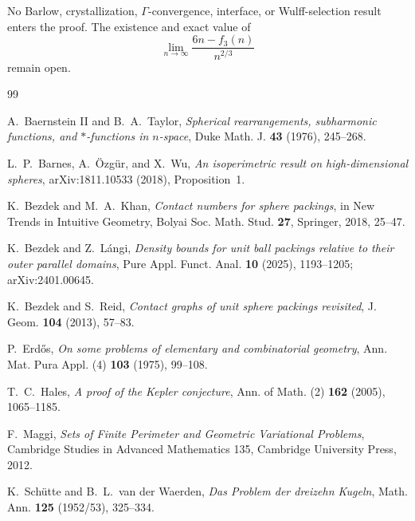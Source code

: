 No Barlow, crystallization, $\Gamma$-convergence, interface, or Wulff-selection
result enters the proof.  The existence and exact value of
\[
 \lim_{n\to\infty}\frac{6n-f_3(n)}{n^{2/3}}
\]
remain open.

\begin{thebibliography}{99}

A.~Baernstein II and B.~A.~Taylor,
\emph{Spherical rearrangements, subharmonic functions, and $*$-functions in
$n$-space}, Duke Math. J. \textbf{43} (1976), 245--268.

L.~P.~Barnes, A.~\"Ozg\"ur, and X.~Wu,
\emph{An isoperimetric result on high-dimensional spheres},
arXiv:1811.10533 (2018), Proposition~1.

K.~Bezdek and M.~A.~Khan,
\emph{Contact numbers for sphere packings},
in New Trends in Intuitive Geometry,
Bolyai Soc. Math. Stud. \textbf{27}, Springer, 2018, 25--47.

K.~Bezdek and Z.~L\'angi,
\emph{Density bounds for unit ball packings relative to their outer parallel
domains}, Pure Appl. Funct. Anal. \textbf{10} (2025), 1193--1205;
arXiv:2401.00645.

K.~Bezdek and S.~Reid,
\emph{Contact graphs of unit sphere packings revisited},
J. Geom. \textbf{104} (2013), 57--83.

P.~Erd\H{o}s,
\emph{On some problems of elementary and combinatorial geometry},
Ann. Mat. Pura Appl. (4) \textbf{103} (1975), 99--108.

T.~C.~Hales,
\emph{A proof of the Kepler conjecture},
Ann. of Math. (2) \textbf{162} (2005), 1065--1185.

F.~Maggi,
\emph{Sets of Finite Perimeter and Geometric Variational Problems},
Cambridge Studies in Advanced Mathematics 135, Cambridge University Press, 2012.

K.~Sch\"utte and B.~L.~van der Waerden,
\emph{Das Problem der dreizehn Kugeln},
Math. Ann. \textbf{125} (1952/53), 325--334.

\end{thebibliography}
